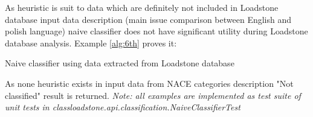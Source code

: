 As heuristic is suit to data which are definitely not included in Loadstone database input data description (main issue comparison between English and polish language) naive classifier does not have significant utility during Loadstone database analysis. Example \ref{alg:6th} proves it:
\begin{algorithm}
	
	\hfill \break
	\caption{Naive classifier using data extracted from Loadstone database}
	\label{alg:5th}
\end{algorithm}
\newline  
As none heuristic exists in input data from NACE categories description "Not classified" result is returned.
\newline
\textit{Note: all examples are implemented as test suite of unit tests in class\newline loadstone.api.classification.NaiveClassifierTest}    
